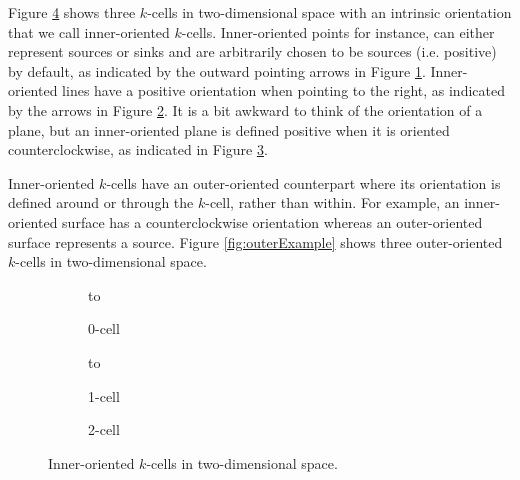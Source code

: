 Figure \ref{fig:innerExample} shows three $k$-cells in two-dimensional space with an intrinsic orientation that we call inner-oriented $k$-cells. Inner-oriented points for instance, can either represent sources or sinks and are arbitrarily chosen to be sources (i.e. positive) by default, as indicated by the outward pointing arrows in Figure \ref{fig:inner0Cell}. Inner-oriented lines have a positive orientation when pointing to the right, as indicated by the arrows in Figure \ref{fig:inner1Cell}. It is a bit awkward to think of the orientation of a plane, but an inner-oriented plane is defined positive when it is oriented counterclockwise, as indicated in Figure \ref{fig:inner2Cell}.

Inner-oriented $k$-cells have an outer-oriented counterpart where its orientation is defined around or through the $k$-cell, rather than within. For example, an inner-oriented surface has a counterclockwise orientation whereas an outer-oriented surface represents a source. Figure \ref{fig:outerExample} shows three outer-oriented $k$-cells in two-dimensional space.
\begin{figure}[ht]
    \newsavebox\boxInner
    \centering
    \begin{subfigure}[c]{0.3\textwidth}
        \centering
        \vbox to \ht{}
        \caption{0-cell}
        \label{fig:inner0Cell}
    \end{subfigure}
    \begin{subfigure}[c]{0.3\textwidth}
        \centering
        \vbox to \ht{}
        \caption{1-cell}
        \label{fig:inner1Cell}
    \end{subfigure}
    \begin{subfigure}[c]{0.3\textwidth}
        \centering
        \centering
        \usebox{\boxInner}
        \caption{2-cell}
        \label{fig:inner2Cell}
    \end{subfigure}
    \caption{Inner-oriented $k$-cells in two-dimensional space.}
    \label{fig:innerExample}
\end{figure}
